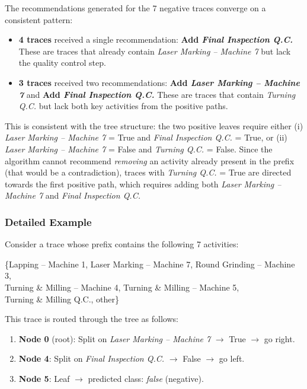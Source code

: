 \documentclass{article}
\begin{document}
The recommendations generated for the 7 negative traces converge on a consistent pattern:

\begin{itemize}
    \item \textbf{4 traces} received a single recommendation: \textbf{Add \textit{Final Inspection Q.C.}} These are traces that already contain \textit{Laser Marking -- Machine 7} but lack the quality control step.
    \item \textbf{3 traces} received two recommendations: \textbf{Add \textit{Laser Marking -- Machine 7}} and \textbf{Add \textit{Final Inspection Q.C.}} These are traces that contain \textit{Turning Q.C.} but lack both key activities from the positive paths.
\end{itemize}

\noindent
This is consistent with the tree structure: the two positive leaves require either (i) \textit{Laser Marking -- Machine 7} = True and \textit{Final Inspection Q.C.} = True, or (ii) \textit{Laser Marking -- Machine 7} = False and \textit{Turning Q.C.} = False. Since the algorithm cannot recommend \textit{removing} an activity already present in the prefix (that would be a contradiction), traces with \textit{Turning Q.C.} = True are directed towards the first positive path, which requires adding both \textit{Laser Marking -- Machine 7} and \textit{Final Inspection Q.C.}

\subsubsection{Detailed Example}

Consider a trace whose prefix contains the following 7 activities:
\begin{center}
\small
\{Lapping -- Machine 1, Laser Marking -- Machine 7, Round Grinding -- Machine 3, \\
Turning \& Milling -- Machine 4, Turning \& Milling -- Machine 5, \\
Turning \& Milling Q.C., other\}
\end{center}

\noindent
This trace is routed through the tree as follows:
\begin{enumerate}
    \item \textbf{Node 0} (root): Split on \textit{Laser Marking -- Machine 7} $\to$ True $\to$ go right.
    \item \textbf{Node 4}: Split on \textit{Final Inspection Q.C.} $\to$ False $\to$ go left.
    \item \textbf{Node 5}: Leaf $\to$ predicted class: \textit{false} (negative).
\end{enumerate}
\end{document}
